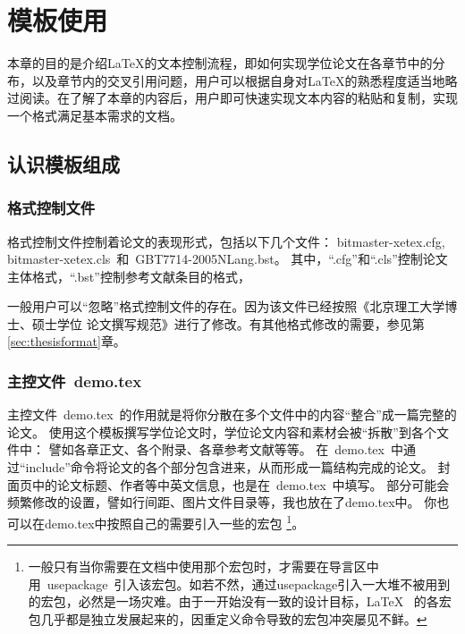
\chapter{模板使用}
\label{chap:textStructure}

本章的目的是介绍\LaTeX{}的文本控制流程，即如何实现学位论文在各章节中的分布，以及章节内的交叉引用问题，用户可以根据自身对\LaTeX{}的熟悉程度适当地略过阅读。在了解了本章的内容后，用户即可快速实现文本内容的粘贴和复制，实现一个格式满足基本需求的文档。



\section{认识模板组成}

\subsection{格式控制文件}
\label{sec:format}

格式控制文件控制着论文的表现形式，包括以下几个文件：
bitmaster-xetex.cfg, bitmaster-xetex.cls~和~GBT7714-2005NLang.bst。
其中，``.cfg''和``.cls''控制论文主体格式，``.bst''控制参考文献条目的格式，

一般用户可以``忽略''格式控制文件的存在。因为该文件已经按照《北京理工大学博士、硕士学位
论文撰写规范》进行了修改。有其他格式修改的需要，参见第\ref{sec:thesisformat}章。


\subsection{主控文件~demo.tex}
\label{sec:demotex}

主控文件~demo.tex~的作用就是将你分散在多个文件中的内容``整合''成一篇完整的论文。
使用这个模板撰写学位论文时，学位论文内容和素材会被``拆散''到各个文件中：
譬如各章正文、各个附录、各章参考文献等等。
在~demo.tex~中通过``include''命令将论文的各个部分包含进来，从而形成一篇结构完成的论文。
封面页中的论文标题、作者等中英文信息，也是在~demo.tex~中填写。
部分可能会频繁修改的设置，譬如行间距、图片文件目录等，我也放在了demo.tex中。
你也可以在demo.tex中按照自己的需要引入一些的宏包
\footnote{一般只有当你需要在文档中使用那个宏包时，才需要在导言区中用~usepackage~引入该宏包。如若不然，通过usepackage引入一大堆不被用到的宏包，必然是一场灾难。由于一开始没有一致的设计目标，\LaTeX~ 的各宏包几乎都是独立发展起来的，因重定义命令导致的宏包冲突屡见不鲜。}。

